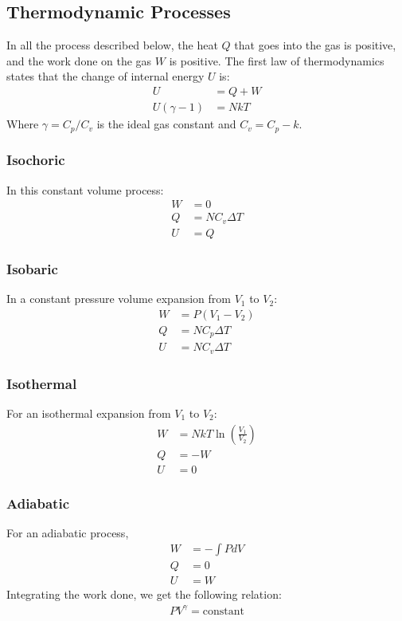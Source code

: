 \documentclass[11pt, letterpaper]{article}
\begin{document}
\begin{multicols*}{3}
\subsection{Thermodynamic Processes}
In all the process described below, the heat $Q$ that goes into the gas is
positive, and the work done on the gas $W$ is positive. The first law of
thermodynamics states that the change of internal energy $U$ is:
\begin{align*}
  U &= Q + W \\
  U (\gamma - 1) &= NkT
\end{align*}
Where $\gamma = C_p/C_v$ is the ideal gas constant and $C_v = C_p - k$.
\subsubsection{Isochoric}
In this constant volume process:
\begin{align*}
  W &= 0 \\
  Q &= N C_v \Delta T \\
  U &= Q
\end{align*}
\subsubsection{Isobaric}
In a constant pressure volume expansion from $V_1$ to $V_2$:
\begin{align*}
  W &= P(V_1 - V_2) \\
  Q &= N C_p \Delta T \\
  U &= N C_v \Delta T
\end{align*}
\subsubsection{Isothermal}
For an isothermal expansion from $V_1$ to $V_2$:
\begin{align*}
  W &= NkT \ln \left( \frac{V_1}{V_2} \right) \\
  Q &= - W \\
  U &= 0
\end{align*}
\subsubsection{Adiabatic}
For an adiabatic process,
\begin{align*}
  W &= - \int P dV \\
  Q &= 0 \\
  U &= W
\end{align*}
Integrating the work done, we get the following relation:
\begin{align*}
  PV^{\gamma} = \text{constant}
\end{align*}

\end{multicols*}
\end{document}
